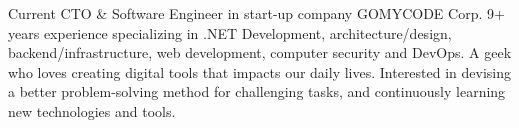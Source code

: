 

\begin{cvparagraph}

Current CTO \& Software Engineer in start-up company GOMYCODE Corp. 9+ years experience specializing in .NET Development, architecture/design, backend/infrastructure, web development, computer security and DevOps. A geek who loves creating digital tools that impacts our daily lives. Interested in devising a better problem-solving method for challenging tasks, and continuously learning new technologies and tools.
\end{cvparagraph}
